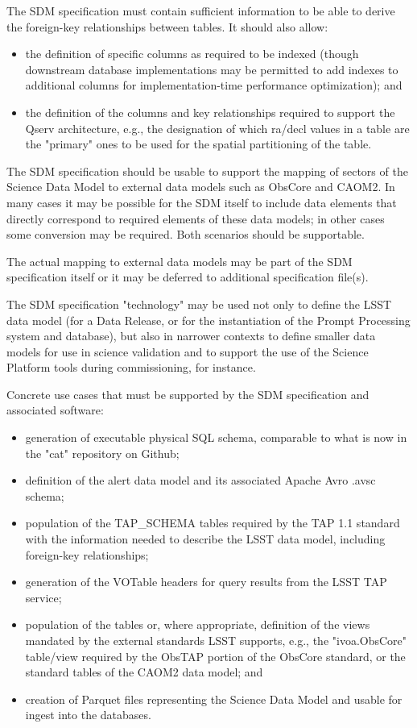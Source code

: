 The SDM specification must contain sufficient information to be able to derive the foreign-key relationships between tables.  It should also allow:
\begin{itemize}
\item the definition of specific columns as required to be indexed (though downstream database implementations may be permitted to add indexes to additional columns for implementation-time performance optimization); and
    \item the definition of the columns and key relationships required to support the Qserv architecture, e.g., the designation of which ra/decl values in a table are the "primary" ones to be used for the spatial partitioning of the table.
\end{itemize}

The SDM specification should be usable to support the mapping of sectors of the Science Data Model to external data models such as ObsCore and CAOM2.  In many cases it may be possible for the SDM itself to include data elements that directly correspond to required elements of these data models; in other cases some conversion may be required.  Both scenarios should be supportable.

The actual mapping to external data models may be part of the SDM specification itself or it may be deferred to additional specification file(s).

The SDM specification "technology" may be used not only to define the LSST data model (for a Data Release, or for the instantiation of the Prompt Processing system and database), but also in narrower contexts to define smaller data models for use in science validation and to support the use of the Science Platform tools during commissioning, for instance.

Concrete use cases that must be supported by the SDM specification and associated software:

\begin{itemize}
\item     generation of executable physical SQL schema, comparable to what is now in the "cat" repository on Github;
\item     definition of the alert data model and its associated Apache Avro .avsc schema;
\item     population of the TAP\_SCHEMA tables required by the TAP 1.1 standard with the information needed to describe the LSST data model, including foreign-key relationships;
\item     generation of the VOTable headers for query results from the LSST TAP service;
\item     population of the tables or, where appropriate, definition of the views mandated by the external standards LSST supports, e.g., the "ivoa.ObsCore" table/view required by the ObsTAP portion of the ObsCore standard, or the standard tables of the CAOM2 data model; and
\item     creation of Parquet files representing the Science Data Model and usable for ingest into the databases.
\end{itemize}

